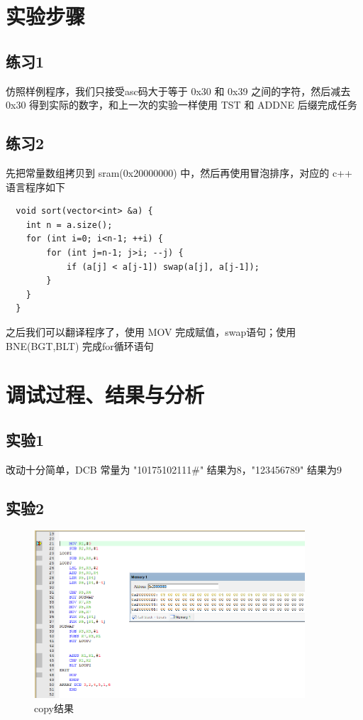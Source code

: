 \documentclass[a4paper,10pt,UTF8]{paper}
\numberwithin{equation}{section}
\numberwithin{figure}{section}
\begin{document}
\section{实验步骤}

\subsection{练习1}

仿照样例程序，我们只接受asc码大于等于 0x30 和 0x39 之间的字符，然后减去 0x30 得到实际的数字，和上一次的实验一样使用 TST 和 ADDNE 后缀完成任务

\subsection{练习2}

先把常量数组拷贝到 sram(0x20000000) 中，然后再使用冒泡排序，对应的 c++ 语言程序如下

\begin{verbatim}
  void sort(vector<int> &a) {
    int n = a.size();
    for (int i=0; i<n-1; ++i) {
        for (int j=n-1; j>i; --j) {
            if (a[j] < a[j-1]) swap(a[j], a[j-1]);
        }
    }
  }
\end{verbatim}

之后我们可以翻译程序了，使用 MOV 完成赋值，swap语句；使用 BNE(BGT,BLT) 完成for循环语句

\section{调试过程、结果与分析}

\subsection{实验1}

改动十分简单，DCB 常量为 "10175102111\#" 结果为8，"123456789" 结果为9

\subsection{实验2}

\begin{figure}[h]
  \centering
  \includegraphics[width=0.9\textwidth]{2.PNG}
  \caption{copy结果}
  \label{fig:2}
\end{figure}
\end{document}
